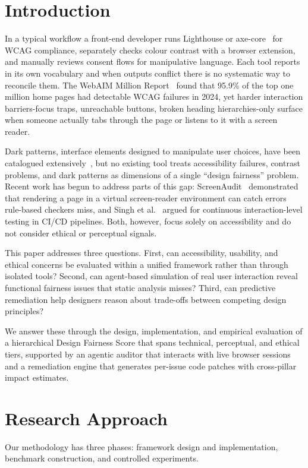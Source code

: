 \documentclass[runningheads]{llncs}
\begin{document}
\section{Introduction}

In a typical workflow a front-end developer runs Lighthouse or axe-core~\cite{axe} for WCAG compliance, separately checks colour contrast with a browser extension, and manually reviews consent flows for manipulative language. Each tool reports in its own vocabulary and when outputs conflict there is no systematic way to reconcile them. The WebAIM Million Report~\cite{webaim2024} found that 95.9\% of the top one million home pages had detectable WCAG failures in 2024, yet harder interaction barriers-focus traps, unreachable buttons, broken heading hierarchies-only surface when someone actually tabs through the page or listens to it with a screen reader.

Dark patterns, interface elements designed to manipulate user choices, have been catalogued extensively~\cite{mathur2019,gray2018,digeronimo2020}, but no existing tool treats accessibility failures, contrast problems, and dark patterns as dimensions of a single ``design fairness'' problem. Recent work has begun to address parts of this gap: ScreenAudit~\cite{screenaudit} demonstrated that rendering a page in a virtual screen-reader environment can catch errors rule-based checkers miss, and Singh et al.~\cite{beyondstatic} argued for continuous interaction-level testing in CI/CD pipelines. Both, however, focus solely on accessibility and do not consider ethical or perceptual signals.

This paper addresses three questions.
First, can accessibility, usability, and ethical concerns be evaluated within a unified framework rather than through isolated tools?
Second, can agent-based simulation of real user interaction reveal functional fairness issues that static analysis misses?
Third, can predictive remediation help designers reason about trade-offs between competing design principles?

We answer these through the design, implementation, and empirical evaluation of a hierarchical Design Fairness Score that spans technical, perceptual, and ethical tiers, supported by an agentic auditor that interacts with live browser sessions and a remediation engine that generates per-issue code patches with cross-pillar impact estimates.


\section{Research Approach}
Our methodology has three phases: framework design and implementation, benchmark construction, and controlled experiments.
\end{document}
